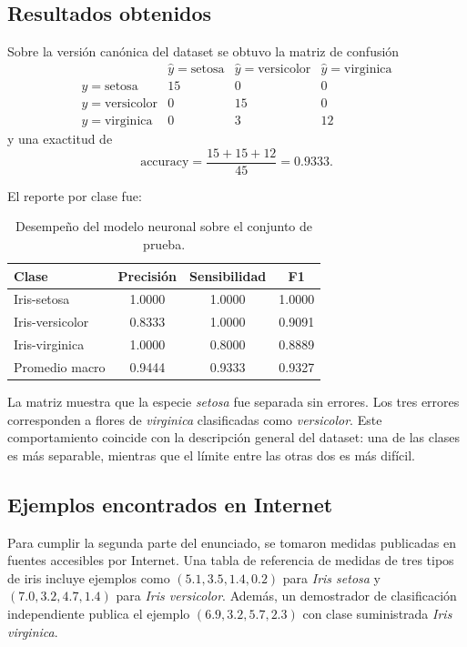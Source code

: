 \documentclass[14pt,twoside]{article}
\begin{document}
\subsection{Resultados obtenidos}

Sobre la versión canónica del dataset se obtuvo la matriz de confusión
\[
\begin{array}{c|ccc}
 & \widehat{y}=\text{setosa} & \widehat{y}=\text{versicolor} & \widehat{y}=\text{virginica}\\
\hline
y=\text{setosa} & 15 & 0 & 0\\
y=\text{versicolor} & 0 & 15 & 0\\
y=\text{virginica} & 0 & 3 & 12
\end{array}
\]
y una exactitud de
\[
\text{accuracy}=\frac{15+15+12}{45}=0.9333.
\]

El reporte por clase fue:

\begin{table}[H]
\centering
\caption{Desempeño del modelo neuronal sobre el conjunto de prueba.}
\begin{tabular}{lccc}
\toprule
Clase & Precisión & Sensibilidad & F1 \\
\midrule
Iris-setosa & 1.0000 & 1.0000 & 1.0000 \\
Iris-versicolor & 0.8333 & 1.0000 & 0.9091 \\
Iris-virginica & 1.0000 & 0.8000 & 0.8889 \\
\midrule
Promedio macro & 0.9444 & 0.9333 & 0.9327 \\
\bottomrule
\end{tabular}
\end{table}

La matriz muestra que la especie \emph{setosa} fue separada sin errores. Los tres errores corresponden a flores de \emph{virginica} clasificadas como \emph{versicolor}. Este comportamiento coincide con la descripción general del dataset: una de las clases es más separable, mientras que el límite entre las otras dos es más difícil. \cite{kaggleiris,irisexternal}

\subsection{Ejemplos encontrados en Internet}

Para cumplir la segunda parte del enunciado, se tomaron medidas publicadas en fuentes accesibles por Internet. Una tabla de referencia de medidas de tres tipos de iris incluye ejemplos como $(5.1,3.5,1.4,0.2)$ para \emph{Iris setosa} y $(7.0,3.2,4.7,1.4)$ para \emph{Iris versicolor}. \cite{wileyiris} Además, un demostrador de clasificación independiente publica el ejemplo $(6.9,3.2,5.7,2.3)$ con clase suministrada \emph{Iris virginica}. \cite{neuraldesigneriris}
\end{document}
